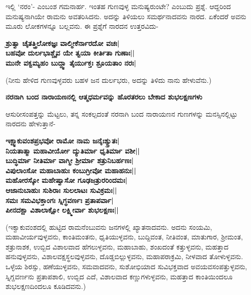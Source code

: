 ಇಲ್ಲಿ `ನರಂ'- ಎಂಬಂಶ ಗಮನಾರ್ಹ. ಇಂತಹ ಗುಣವುಳ್ಳ ಮನುಷ್ಯರುಂಟೇ? ಎಂಬುದು ಪ್ರಶ್ನೆ. ಆದ್ದರಿಂದ ಮನುಷ್ಯನಾಗಿಯೇ ರಾಮನು ಅವತರಿಸಿದನು. ಅದನ್ನು ತಿಳಿಯಲು ಸಮರ್ಥನಾದವನು ನಾರದ. ಏಕೆಂದರೆ ಅವನು ಮೂರು ಲೋಕಗಳನ್ನೂ ಬಲ್ಲವನು. ಈ ಪ್ರಶ್ನೆಗೆ ನಾರದನ ಉತ್ತರವಿದು- 


\begin{center} 

{\bf ಶ್ರುತ್ವಾ ಚೈತತ್ತ್ರಿಲೋಕಜ್ಞಃ ವಾಲ್ಮೀಕೆರ್ನಾರದೋ ವಚಃ|\\ 

ಬಹವೋ ದುರ್ಲಭಾಶ್ಚೈವ ಯೇ ತ್ವಯಾ ಕೀರ್ತಿತಾ ಗುಣಾಃ||\\ 

ಮುನೇ ವಕ್ವಮ್ಯಹಂ ಬುದ್ದ್ವಾ ತೈರ್ಯುಕ್ತಃ ಶ್ರೂಯತಾಂ ನರಃ|} 

\end{center} 


(ನೀನು ಹೇಳಿದ ಗುಣವುಳ್ಳವರು ಬಹಳ ಜನ ದುರ್ಲಭರು, ಅದನ್ನು ತಿಳಿದು ನಾನು ಹೇಳುವೆನು.) 


{\bf ನರನಾಗಿ ಬಂದ ನಾರಾಯಣನಲ್ಲಿ ಆತ್ಮಧರ್ಮವನ್ನು ಹೊರತರಲು ಬೇಕಾದ ಶುಭಲಕ್ಷಣಗಳು} 


ಆಸುರೀಸಂಪತ್ತನ್ನು ಮೆಟ್ಟಲು, ತನ್ನ ಸಂಕಲ್ಪದಂತೆ ನರನಾಗಿ ಬಂದ ನಾರಾಯಣನ ಗುಣಗಳನ್ನು ಮನಸ್ಸಿನಲ್ಲಿಟ್ಟು ನಾರದನು ಹೇಳುತ್ತಾನೆ- 


\begin{center} 

{\bf ಇಕ್ಷ್ವಾಕುವಂಶಪ್ರಭವೋ ರಾಮೋ ನಾಮ ಜನೈಃಶ್ಯ್ರುತಃ|\\ 

ನಿಯತಾತ್ಮಾ ಮಹಾವೀರ್ಯೋ ದ್ಯುತಿರ್ಮಾ ಧೃತಿರ್ಮಾ ವಶೀ||\\ 

ಬುದ್ಧಿರ್ಮಾ ನೀತಿರ್ಮಾ ವಾಗ್ಮೀ ಶ್ರೀರ್ಮಾ ಶತ್ರುನಿಬರ್ಹಣಃ|\\ 

ವಿಪುಲಾಂಸೋ ಮಹಾಬಾಹುಃ ಕಂಬುಗ್ರೀವೋ ಮಹಾಹನುಃ||\\ 

ಮಹೋರಸ್ಕೋ ಮಹೇಷ್ವಾಸೋ ಗೂಢಜತ್ರುರರಿಂದಮಃ|\\ 

ಆಜಾನುಬಾಹುಃ ಸುಶಿರಾಃ ಸುಲಲಾಟಃ ಸುವಿಕ್ರಮಃ||\\ 

ಸಮಃ ಸಮವಿಭಕ್ತಾಂಗಃ ಸ್ನಿಗ್ಧವರ್ಣಃ ಪ್ರತಾಪರ್ವಾ|\\ 

ಪೀನದಕ್ಷಾ ವಿಶಾಲಾಕ್ಷೋ ಲಕ್ಷ್ಮೀರ್ವಾ ಶುಭಲಕ್ಷಣಃ||} 

\end{center} 


(ಇಕ್ವಾಕುವಂಶದಲ್ಲಿ ಹುಟ್ಟಿದ ರಾಮನೆಂಬುವನು ಜನಗಳಲ್ಲಿ ಖ್ಯಾತನಾದವನು. ಅದನು ಸಂಯಮಿ, ಮಹಾವೀರ್ಯವುಳ್ಳವನು, ಕಾಂತಿಮಂತನು, ಧೃತಿಯುಳ್ಳವನು, ಬುದ್ದಿವಂತ, ನೀತಿವಂತ, ಮಾತುಗಾರ, ಶ್ರೀಮಂತ, ಶತ್ರುನಾಶಕ, ಉಬ್ಬಿದ ವಿಶಾಲವಾದ ಹೆಗಲುಳ್ಳವನು, ಮಹಾಬಾಹು, ಶಂಖದಂತೆ ಕತ್ತುಳ್ಳವನು, ಮಹತ್ತಾದ ಹನುವುಳ್ಳವನು, ವಿಶಾಲವಕ್ಷಸ್ಥಲವುಳ್ಳವನು, ದೊಡ್ಡಬಿಲ್ಲುಳ್ಳವನು, ಮಹಾಪರಾಕ್ರಮಿ, ನೀಳವಾದ ತೋಳುಳ್ಳವನು. ಒಳ್ಳೆಯ ಶಿರಸ್ಸು, ಹಣೆಯುಳ್ಳವನು, ಸಮವಾದವನು, ಸುಶೋಭಿಯಾದ ಸುವಿಭಕ್ತವಾದ ಅವಯವಸಂಪತ್ತುಳ್ಳವನು, ಸ್ನಿಗ್ದವರ್ಣನು ಪ್ರತಾಪಶಾಲಿ, ಉಬ್ಬಿದ ಎದೆ, ವಿಶಾಲವಾದ ಕಣ್ಣುಗಳುಳ್ಳವನು, ಮಹತ್ತಾದ ಕಾಂತಿಯಿಂದಲೂ ಶುಭಲಕ್ಷಣದಿಂದಲೂ ಕೂಡಿದವನು.) 


